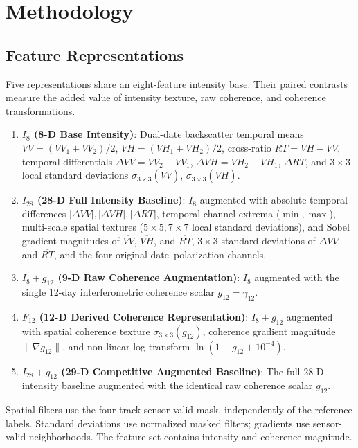 \section{Methodology}
\subsection{Feature Representations}
\label{sec:ladder}
Five representations share an eight-feature intensity base. Their paired contrasts measure the added value of intensity texture, raw coherence, and coherence transformations.
\begin{enumerate}
    \item \textbf{$I_8$ (8-D Base Intensity)}: Dual-date backscatter temporal means $\overline{VV} = (VV_1 + VV_2)/2$, $\overline{VH} = (VH_1 + VH_2)/2$, cross-ratio $\overline{RT} = \overline{VH} - \overline{VV}$, temporal differentials $\Delta VV = VV_2 - VV_1$, $\Delta VH = VH_2 - VH_1$, $\Delta RT$, and $3 \times 3$ local standard deviations $\sigma_{3\times 3}(\overline{VV})$, $\sigma_{3\times 3}(\overline{VH})$.
    \item \textbf{$I_{28}$ (28-D Full Intensity Baseline)}: $I_8$ augmented with absolute temporal differences $|\Delta VV|, |\Delta VH|, |\Delta RT|$, temporal channel extrema ($\min, \max$), multi-scale spatial textures ($5 \times 5, 7 \times 7$ local standard deviations), and Sobel gradient magnitudes of $\overline{VV}$, $\overline{VH}$, and $\overline{RT}$, $3\times3$ standard deviations of $\Delta VV$ and $\overline{RT}$, and the four original date--polarization channels.
    \item \textbf{$I_8+g_{12}$ (9-D Raw Coherence Augmentation)}: $I_8$ augmented with the single 12-day interferometric coherence scalar $g_{12} = \gamma_{12}$.
    \item \textbf{$F_{12}$ (12-D Derived Coherence Representation)}: $I_8+g_{12}$ augmented with spatial coherence texture $\sigma_{3\times 3}(g_{12})$, coherence gradient magnitude $\|\nabla g_{12}\|$, and non-linear log-transform $\ln(1 - g_{12} + 10^{-4})$.
    \item \textbf{$I_{28}+g_{12}$ (29-D Competitive Augmented Baseline)}: The full 28-D intensity baseline augmented with the identical raw coherence scalar $g_{12}$.
\end{enumerate}
Spatial filters use the four-track sensor-valid mask, independently of the reference labels. Standard deviations use normalized masked filters; gradients use sensor-valid neighborhoods. The feature set contains intensity and coherence magnitude.

